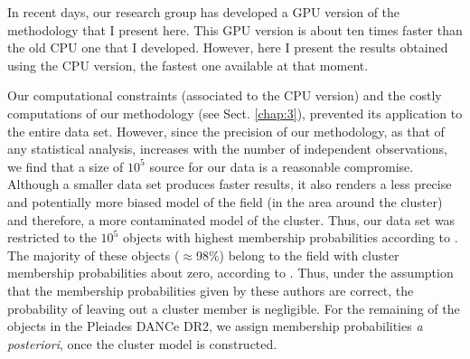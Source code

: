 In recent days, our research group has developed a GPU version of the methodology that I present here. This GPU version is about ten times faster than the old CPU one that I developed. However, here I present the results obtained using the CPU version, the fastest one available at that moment.

Our computational constraints (associated to the CPU version) and the costly computations of our methodology (see Sect. \ref{chap:3}), prevented its application to the entire data set. However, since the precision of our methodology, as that of any statistical analysis, increases with the number of independent observations, we find that a size of $10^5$ source for our data is a reasonable compromise. Although a smaller data set produces faster results, it also renders a less precise and potentially more biased model of the field (in the area around the cluster) and therefore, a more contaminated model of the cluster. Thus, our data set was restricted to the $10^5$ objects with highest membership probabilities according to \citet{Bouy2015}. The majority of these objects ($\approx$98\%) belong to the field with cluster membership probabilities about zero, according to \citet{Sarro2014,Bouy2015}. Thus, under the assumption that the membership probabilities given by these authors are correct, the probability of leaving out a cluster member is negligible. For the remaining of the objects in the Pleiades DANCe DR2, we assign membership probabilities \emph{a posteriori}, once the cluster model is constructed. 



